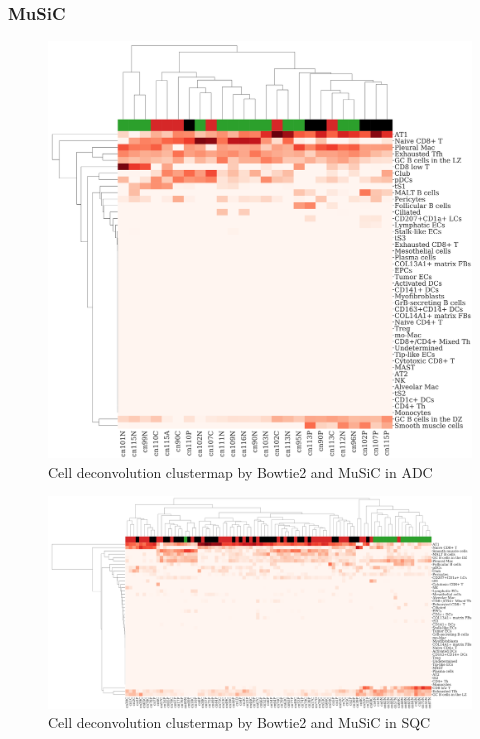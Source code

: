 \documentclass[a4paper]{article}
\begin{document}
            \subsubsection{MuSiC}
                \begin{figure}[htbp]
                    \centering
                    \includegraphics[width=0.6 \linewidth]{figures/MuSiC/clustermap/Bowtie2.ADC.cluster.pdf}
                    \caption{Cell deconvolution clustermap by Bowtie2 and MuSiC in ADC}
                    \label{fig:Deconvolution-MuSiC-Bowtie2-cluster-ADC}
                \end{figure}

                \begin{figure}[htbp]
                    \centering
                    \includegraphics[width=\linewidth]{figures/MuSiC/clustermap/Bowtie2.SQC.cluster.pdf}
                    \caption{Cell deconvolution clustermap by Bowtie2 and MuSiC in SQC}
                    \label{fig:Deconvolution-MuSiC-Bowtie2-cluster-SQC}
                \end{figure}
\end{document}
